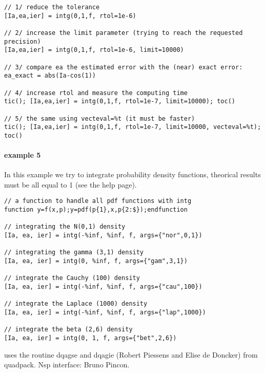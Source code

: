 \begin{examples}
\begin{Verbatim}
// 1/ reduce the tolerance
[Ia,ea,ier] = intg(0,1,f, rtol=1e-6)

// 2/ increase the limit parameter (trying to reach the requested precision)
[Ia,ea,ier] = intg(0,1,f, rtol=1e-6, limit=10000)

// 3/ compare ea the estimated error with the (near) exact error:
ea_exact = abs(Ia-cos(1))

// 4/ increase rtol and measure the computing time
tic(); [Ia,ea,ier] = intg(0,1,f, rtol=1e-7, limit=10000); toc()

// 5/ the same using vecteval=%t (it must be faster)
tic(); [Ia,ea,ier] = intg(0,1,f, rtol=1e-7, limit=10000, vecteval=%t); toc()
\end{Verbatim}

  
\paragraph{example 5} In this example we try to integrate probability 
density functions, theorical results must be all equal to 1 (see the
 help page). 
\begin{Verbatim}
// a function to handle all pdf functions with intg
function y=f(x,p);y=pdf(p{1},x,p{2:$});endfunction

// integrating the N(0,1) density
[Ia, ea, ier] = intg(-%inf, %inf, f, args={"nor",0,1})

// integrating the gamma (3,1) density
[Ia, ea, ier] = intg(0, %inf, f, args={"gam",3,1})

// integrate the Cauchy (100) density
[Ia, ea, ier] = intg(-%inf, %inf, f, args={"cau",100})

// integrate the Laplace (1000) density
[Ia, ea, ier] = intg(-%inf, %inf, f, args={"lap",1000})

// integrate the beta (2,6) density
[Ia, ea, ier] = intg(0, 1, f, args={"bet",2,6})
\end{Verbatim}

\end{examples}

\begin{manseealso}
\end{manseealso}

\begin{authors}
  uses the routine dqagse and dqagie (Robert Piessens and Elise de Doncker) from
  quadpack. Nsp interface: Bruno Pincon.
\end{authors}
